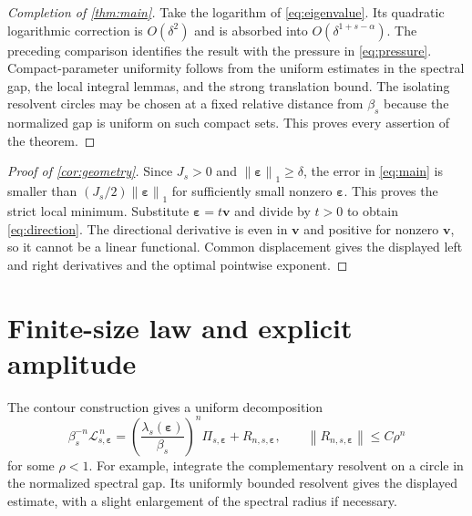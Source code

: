 \documentclass[11pt,a4paper]{article}
\numberwithin{equation}{section}
\theoremstyle{definition}
\theoremstyle{remark}
\newcommand{\Lop}{\mathcal L}
\newcommand{\norm}[1]{\left\lVert#1\right\rVert}
\newcommand{\eps}{\boldsymbol\varepsilon}
\newcommand{\vel}{\boldsymbol v}
\newcommand{\Proj}{\Pi}
\begin{document}
\begin{proof}[Completion of \cref{thm:main}]
Take the logarithm of \cref{eq:eigenvalue}. Its quadratic logarithmic
correction is $O(\delta^2)$ and is absorbed into
$O(\delta^{1+s-\alpha})$. The preceding comparison identifies the
result with the pressure in \cref{eq:pressure}. Compact-parameter
uniformity follows from the uniform estimates in the spectral gap,
the local integral lemmas, and the strong translation bound. The
isolating resolvent circles may be chosen at a fixed relative distance
from $\beta_s$ because the normalized gap is uniform on such compact
sets. This proves every assertion of the theorem.
\end{proof}

\begin{proof}[Proof of \cref{cor:geometry}]
Since $J_s>0$ and $\norm\eps_1\geq\delta$, the error in
\cref{eq:main} is smaller than $(J_s/2)\norm\eps_1$ for sufficiently
small nonzero $\eps$. This proves the strict local minimum. Substitute
$\eps=t\vel$ and divide by $t>0$ to obtain \cref{eq:direction}.
The directional derivative is even in $\vel$ and positive for nonzero
$\vel$, so it cannot be a linear functional. Common displacement gives
the displayed left and right derivatives and the optimal pointwise
exponent.
\end{proof}

\section{Finite-size law and explicit amplitude}
\label{sec:finite-proof}

The contour construction gives a uniform decomposition
\begin{equation}
 \beta_s^{-n}\Lop_{s,\eps}^{\,n}
 =\left(\frac{\lambda_s(\eps)}{\beta_s}\right)^n\Proj_{s,\eps}
       +R_{n,s,\eps},\qquad
 \norm{R_{n,s,\eps}}\leq C\rho^n
 \label{eq:spectral-powers}
\end{equation}
for some $\rho<1$. For example, integrate the complementary resolvent
on a circle in the normalized spectral gap. Its uniformly bounded
resolvent gives the displayed estimate, with a slight enlargement of
the spectral radius if necessary.
\end{document}
